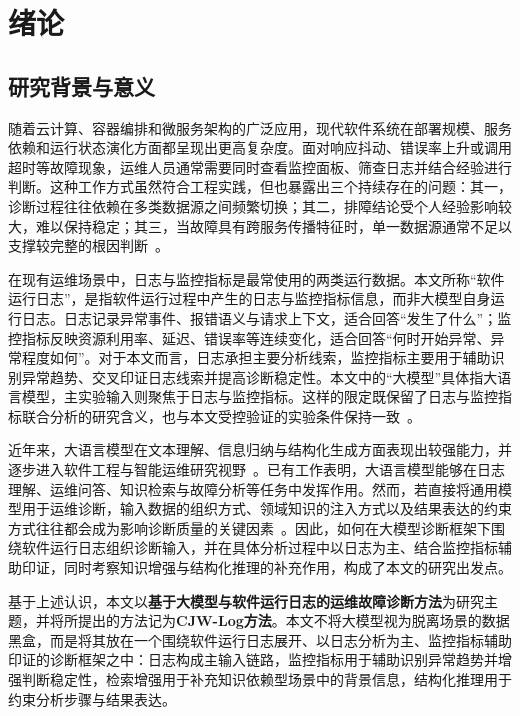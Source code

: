 \chapter{绪论}

\section{研究背景与意义}

随着云计算、容器编排和微服务架构的广泛应用，现代软件系统在部署规模、服务依赖和运行状态演化方面都呈现出更高复杂度。面对响应抖动、错误率上升或调用超时等故障现象，运维人员通常需要同时查看监控面板、筛查日志并结合经验进行判断。这种工作方式虽然符合工程实践，但也暴露出三个持续存在的问题：其一，诊断过程往往依赖在多类数据源之间频繁切换；其二，排障结论受个人经验影响较大，难以保持稳定；其三，当故障具有跨服务传播特征时，单一数据源通常不足以支撑较完整的根因判断~\cite{soldani2023survey,zhang2024fdsurvey,zhang2026aiopssurvey}。

在现有运维场景中，日志与监控指标是最常使用的两类运行数据。本文所称“软件运行日志”，是指软件运行过程中产生的日志与监控指标信息，而非大模型自身运行日志。日志记录异常事件、报错语义与请求上下文，适合回答“发生了什么”；监控指标反映资源利用率、延迟、错误率等连续变化，适合回答“何时开始异常、异常程度如何”。对于本文而言，日志承担主要分析线索，监控指标主要用于辅助识别异常趋势、交叉印证日志线索并提高诊断稳定性。本文中的“大模型”具体指大语言模型，主实验输入则聚焦于日志与监控指标。这样的限定既保留了日志与监控指标联合分析的研究含义，也与本文受控验证的实验条件保持一致~\cite{jia2020logsurvey,cheng2023rcasurvey,pham2024rcacausal}。

近年来，大语言模型在文本理解、信息归纳与结构化生成方面表现出较强能力，并逐步进入软件工程与智能运维研究视野~\cite{hou2024llm4se,zhang2026aiopssurvey}。已有工作表明，大语言模型能够在日志理解、运维问答、知识检索与故障分析等任务中发挥作用。然而，若直接将通用模型用于运维诊断，输入数据的组织方式、领域知识的注入方式以及结果表达的约束方式往往都会成为影响诊断质量的关键因素~\cite{roy2024agents,szandala2025reliability}。因此，如何在大模型诊断框架下围绕软件运行日志组织诊断输入，并在具体分析过程中以日志为主、结合监控指标辅助印证，同时考察知识增强与结构化推理的补充作用，构成了本文的研究出发点。

基于上述认识，本文以\textbf{基于大模型与软件运行日志的运维故障诊断方法}为研究主题，并将所提出的方法记为\textbf{CJW-Log方法}。本文不将大模型视为脱离场景的数据黑盒，而是将其放在一个围绕软件运行日志展开、以日志分析为主、监控指标辅助印证的诊断框架之中：日志构成主输入链路，监控指标用于辅助识别异常趋势并增强判断稳定性，检索增强用于补充知识依赖型场景中的背景信息，结构化推理用于约束分析步骤与结果表达。

